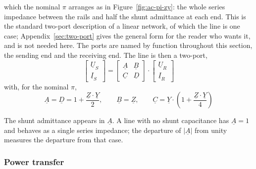 which the nominal $\pi$ arranges as in Figure~\ref{fig:ac-pi-zy}: the whole
series impedance between the rails and half the shunt admittance at each
end. This is the standard two-port description of a linear network, of which
the line is one case; Appendix~\ref{sec:two-port} gives the general form for
the reader who wants it, and is not needed here. The ports are named by
function throughout this section, the sending end and the receiving end. The
line is then a two-port,
\begin{equation}
  \begin{bmatrix} \underline{U}_S \\ \underline{I}_S \end{bmatrix}
  =
  \begin{bmatrix} \underline{A} & \underline{B} \\
                  \underline{C} & \underline{D} \end{bmatrix}
  \cdot
  \begin{bmatrix} \underline{U}_R \\ \underline{I}_R \end{bmatrix}
  \label{eq:ac-abcd}
\end{equation}
with, for the nominal $\pi$,
\begin{equation}
  \underline{A} = \underline{D} = 1 + \frac{\underline{Z} \cdot \underline{Y}}{2},
  \qquad
  \underline{B} = \underline{Z},
  \qquad
  \underline{C} = \underline{Y} \cdot
      \left(1 + \frac{\underline{Z} \cdot \underline{Y}}{4}\right)
  \label{eq:ac-abcd-pi}
\end{equation}

The shunt admittance appears in $\underline{A}$. A line with no shunt
capacitance has $\underline{A} = 1$ and behaves as a single series
impedance; the departure of $\left|\underline{A}\right|$ from unity
measures the departure from that case.

\subsubsection{Power transfer}
\label{sec:ac-power-transfer}


